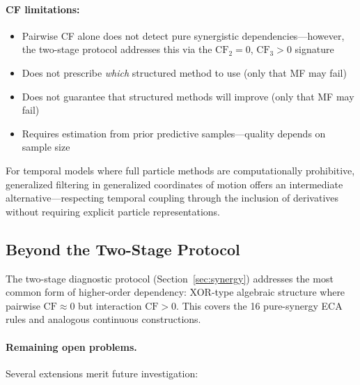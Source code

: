 \documentclass[10pt]{article} %
\theoremstyle{plain}
\theoremstyle{definition}
\newcommand{\CF}{\mathrm{CF}}
\begin{document}
\paragraph{CF limitations:}
\begin{itemize}
    \item Pairwise CF alone does not detect pure synergistic dependencies---however, the two-stage protocol addresses this via the $\CF_2 = 0$, $\CF_3 > 0$ signature
    \item Does not prescribe \emph{which} structured method to use (only that MF may fail)
    \item Does not guarantee that structured methods will improve (only that MF may fail)
    \item Requires estimation from prior predictive samples---quality depends on sample size
\end{itemize}

\noindent For temporal models where full particle methods are computationally prohibitive, generalized filtering in generalized coordinates of motion offers an intermediate alternative---respecting temporal coupling through the inclusion of derivatives without requiring explicit particle representations.

\subsection{Beyond the Two-Stage Protocol}
\label{sec:higher_order}

The two-stage diagnostic protocol (Section~\ref{sec:synergy}) addresses the most common form of higher-order dependency: XOR-type algebraic structure where pairwise $\CF \approx 0$ but interaction $\CF > 0$. This covers the 16 pure-synergy ECA rules and analogous continuous constructions.

\paragraph{Remaining open problems.} Several extensions merit future investigation:
\end{document}
